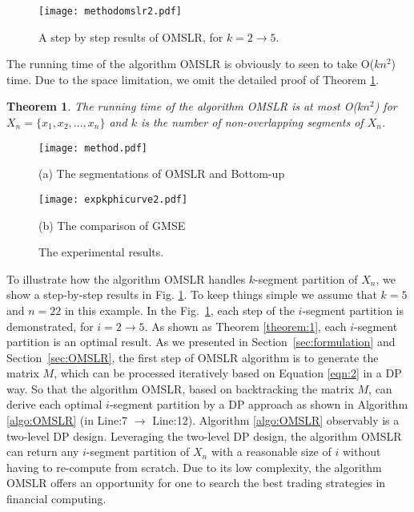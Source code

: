 \documentclass{article}
\newtheorem{theorem}{Theorem}
\begin{document}
\begin{figure}[t]
  \centering
  \centerline{\texttt{[image: methodomslr2.pdf]}}
  \caption{A step by step results of OMSLR, for $k=2 \rightarrow 5$.}
  \label{fig:res1}
\end{figure}

The running time of the algorithm OMSLR is obviously to seen to take O($kn^2$) time. Due to the space limitation, we omit the detailed proof of Theorem \ref{theorem:2}.

\begin{theorem}\label{theorem:2}
  The running time of the algorithm OMSLR is at most O($kn^2$) for $X_n = \{x_1, x_2,\dots,x_n\}$ and $k$ is the number of non-overlapping segments of $X_n$.
\end{theorem}

\begin{figure}[t]
\begin{minipage}[b]{1.0\linewidth}
    \centering
    \centerline{\texttt{[image: method.pdf]}}
    \centerline{(a) The segmentations of OMSLR and Bottom-up}\medskip
  \end{minipage}
  \begin{minipage}[b]{1.0\linewidth}
    \centering
    \centerline{\texttt{[image: expkphicurve2.pdf]}}
    \centerline{(b) The comparison of GMSE }\medskip
  \end{minipage}
  \caption{The experimental results.}
  \label{fig:res2}
\end{figure}


To illustrate how the algorithm OMSLR handles $k$-segment partition of $X_{n}$, we show a step-by-step results in Fig. \ref{fig:res1}. To keep things simple we assume that $k=5$ and $n=22$ in this example. In the Fig.~\ref{fig:res1}, each step of the $i$-segment partition is demonstrated, for $i=2 \rightarrow 5$. As shown as Theorem \ref{theorem:1}, each $i$-segment partition is an optimal result. As we presented in Section~\ref{sec:formulation} and Section~\ref{sec:OMSLR}, the first step of OMSLR algorithm is to generate the matrix $M$, which can be processed iteratively based on Equation \ref{eqn:2} in a DP way. So that the algorithm OMSLR, based on backtracking the matrix $M$, can derive each optimal $i$-segment partition by a DP approach as shown in Algorithm \ref{algo:OMSLR} (in Line:7 $\rightarrow$ Line:12). Algorithm \ref{algo:OMSLR} observably is a two-level DP design. Leveraging the two-level DP design, the algorithm OMSLR can return any $i$-segment partition of $X_{n}$ with a reasonable size of $i$ without having to re-compute from scratch. Due to its low complexity, the algorithm OMSLR offers an opportunity for one to search the best trading strategies in financial computing.
\end{document}
